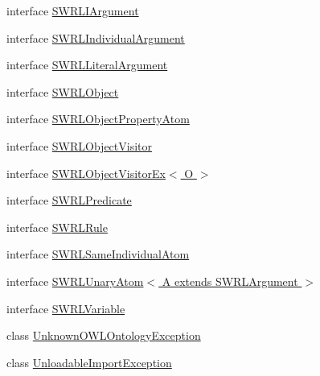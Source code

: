 \begin{DoxyCompactItemize}
\item 
interface \hyperlink{interfaceorg_1_1semanticweb_1_1owlapi_1_1model_1_1_s_w_r_l_i_argument}{S\-W\-R\-L\-I\-Argument}
\item 
interface \hyperlink{interfaceorg_1_1semanticweb_1_1owlapi_1_1model_1_1_s_w_r_l_individual_argument}{S\-W\-R\-L\-Individual\-Argument}
\item 
interface \hyperlink{interfaceorg_1_1semanticweb_1_1owlapi_1_1model_1_1_s_w_r_l_literal_argument}{S\-W\-R\-L\-Literal\-Argument}
\item 
interface \hyperlink{interfaceorg_1_1semanticweb_1_1owlapi_1_1model_1_1_s_w_r_l_object}{S\-W\-R\-L\-Object}
\item 
interface \hyperlink{interfaceorg_1_1semanticweb_1_1owlapi_1_1model_1_1_s_w_r_l_object_property_atom}{S\-W\-R\-L\-Object\-Property\-Atom}
\item 
interface \hyperlink{interfaceorg_1_1semanticweb_1_1owlapi_1_1model_1_1_s_w_r_l_object_visitor}{S\-W\-R\-L\-Object\-Visitor}
\item 
interface \hyperlink{interfaceorg_1_1semanticweb_1_1owlapi_1_1model_1_1_s_w_r_l_object_visitor_ex_3_01_o_01_4}{S\-W\-R\-L\-Object\-Visitor\-Ex$<$ O $>$}
\item 
interface \hyperlink{interfaceorg_1_1semanticweb_1_1owlapi_1_1model_1_1_s_w_r_l_predicate}{S\-W\-R\-L\-Predicate}
\item 
interface \hyperlink{interfaceorg_1_1semanticweb_1_1owlapi_1_1model_1_1_s_w_r_l_rule}{S\-W\-R\-L\-Rule}
\item 
interface \hyperlink{interfaceorg_1_1semanticweb_1_1owlapi_1_1model_1_1_s_w_r_l_same_individual_atom}{S\-W\-R\-L\-Same\-Individual\-Atom}
\item 
interface \hyperlink{interfaceorg_1_1semanticweb_1_1owlapi_1_1model_1_1_s_w_r_l_unary_atom_3_01_a_01extends_01_s_w_r_l_argument_01_4}{S\-W\-R\-L\-Unary\-Atom$<$ A extends S\-W\-R\-L\-Argument $>$}
\item 
interface \hyperlink{interfaceorg_1_1semanticweb_1_1owlapi_1_1model_1_1_s_w_r_l_variable}{S\-W\-R\-L\-Variable}
\item 
class \hyperlink{classorg_1_1semanticweb_1_1owlapi_1_1model_1_1_unknown_o_w_l_ontology_exception}{Unknown\-O\-W\-L\-Ontology\-Exception}
\item 
class \hyperlink{classorg_1_1semanticweb_1_1owlapi_1_1model_1_1_unloadable_import_exception}{Unloadable\-Import\-Exception}
\end{DoxyCompactItemize}
